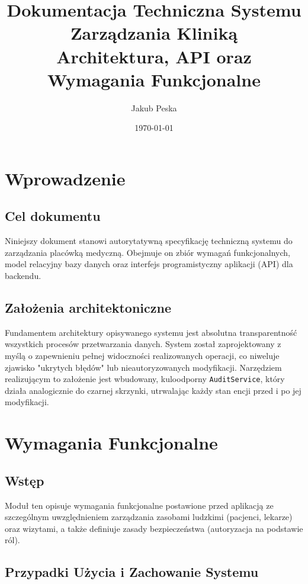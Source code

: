 \documentclass[a4paper,12pt]{report}
\title{
    \vspace{2cm}
    \Huge \textbf{Dokumentacja Techniczna Systemu Zarządzania Kliniką}\\
    \vspace{1cm}
    \Large Architektura, API oraz Wymagania Funkcjonalne
    \vspace{2cm}
}
\author{Jakub Peska}
\date{\today}
\begin{document}
\maketitle

\tableofcontents
\newpage

\chapter{Wprowadzenie}
\section{Cel dokumentu}
Niniejszy dokument stanowi autorytatywną specyfikację techniczną systemu do zarządzania placówką medyczną. Obejmuje on zbiór wymagań funkcjonalnych, model relacyjny bazy danych oraz interfejs programistyczny aplikacji (API) dla backendu. 

\section{Założenia architektoniczne}
Fundamentem architektury opisywanego systemu jest absolutna transparentność wszystkich procesów przetwarzania danych. System został zaprojektowany z myślą o zapewnieniu pełnej widoczności realizowanych operacji, co niweluje zjawisko "ukrytych błędów" lub nieautoryzowanych modyfikacji. Narzędziem realizującym to założenie jest wbudowany, kuloodporny  \texttt{AuditService}, który działa analogicznie do czarnej skrzynki, utrwalając każdy stan encji przed i po jej modyfikacji.

\chapter{Wymagania Funkcjonalne}
\section{Wstęp}
Moduł ten opisuje wymagania funkcjonalne postawione przed aplikacją ze szczególnym uwzględnieniem zarządzania zasobami ludzkimi (pacjenci, lekarze) oraz wizytami, a także definiuje zasady bezpieczeństwa (autoryzacja na podstawie ról).

\section{Przypadki Użycia i Zachowanie Systemu}
\end{document}

